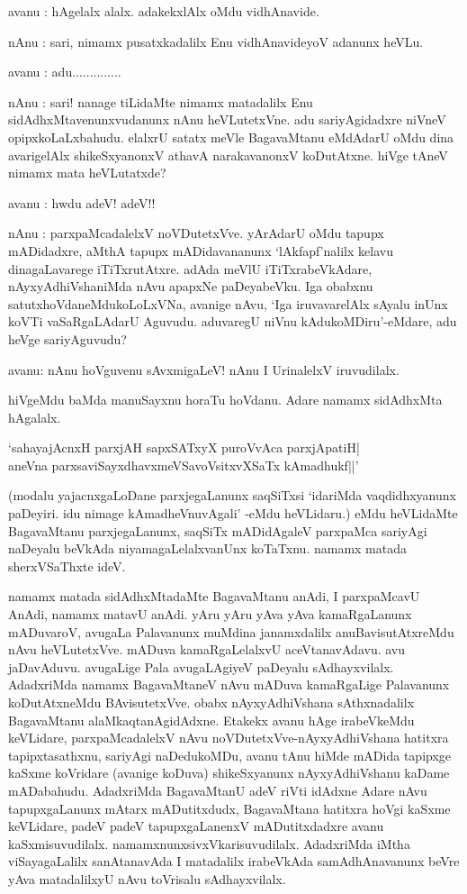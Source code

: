 avanu : hAgelalx alalx. adakekxlAlx oMdu vidhAnavide.

nAnu : sari, nimamx pusatxkadalilx Enu vidhAnavideyoV adanunx heVLu.

avanu : adu..............

nAnu : sari! nanage tiLidaMte nimamx matadalilx Enu sidAdhxMtavenunxvudanunx nAnu heVLutetxVne. adu sariyAgidadxre niVneV opipxkoLaLxbahudu. elalxrU satatx meVle BagavaMtanu eMdAdarU oMdu dina avarigelAlx shikeSxyanonxV athavA narakavanonxV koDutAtxne. hiVge tAneV 
nimamx mata heVLutatxde?

avanu : hwdu adeV! adeV!!

nAnu : parxpaMcadalelxV noVDutetxVve. yArAdarU oMdu tapupx mADidadxre, aMthA tapupx mADidavananunx `lAkfapf'nalilx kelavu dinagaLavarege iTiTxrutAtxre. adAda meVlU iTiTxrabeVkAdare, nAyxyAdhiVshaniMda nAvu apapxNe paDeyabeVku. Iga obabxnu satutxhoVdaneMdukoLoLxVNa, avanige nAvu, `Iga iruvavarelAlx sAyalu inUnx koVTi vaSaRgaLAdarU Aguvudu. aduvaregU niVnu kAdukoMDiru'-eMdare, adu heVge sariyAguvudu?

avanu: nAnu hoVguvenu sAvxmigaLeV! nAnu I UrinalelxV iruvudilalx.

hiVgeMdu baMda manuSayxnu horaTu hoVdanu. Adare namamx sidAdhxMta hAgalalx.

\begin{shloka}
`sahayajAcnxH parxjAH sapxSATxyX puroVvAca parxjApatiH|\\
aneVna parxsaviSayxdhavxmeVSavoV\s sitxvXSaTx kAmadhukf||'
\end{shloka}

(modalu yajacnxgaLoDane parxjegaLanunx saqSiTxsi `idariMda vaqdidhxyanunx paDeyiri. idu nimage kAmadheVnuvAgali' -eMdu heVLidaru.) eMdu heVLidaMte BagavaMtanu parxjegaLanunx, saqSiTx mADidAgaleV parxpaMca sariyAgi naDeyalu beVkAda niyamagaLelalxvanUnx koTaTxnu. 
namamx matada sherxVSaThxte ideV.

namamx matada sidAdhxMtadaMte BagavaMtanu anAdi, I parxpaMcavU AnAdi, namamx matavU anAdi. yAru yAru yAva yAva kamaRgaLanunx mADuvaroV, avugaLa Palavanunx muMdina janamxdalilx anuBavisutAtxreMdu nAvu heVLutetxVve. mADuva kamaRgaLelalxvU aceVtanavAdavu. avu jaDavAduvu. avugaLige Pala avugaLAgiyeV paDeyalu sAdhayxvilalx. AdadxriMda namamx BagavaMtaneV nAvu mADuva kamaRgaLige Palavanunx koDutAtxneMdu BAvisutetxVve. obabx nAyxyAdhiVshana sAthxnadalilx BagavaMtanu alaMkaqtanAgidAdxne. Etakekx avanu hAge irabeVkeMdu 
keVLidare, parxpaMcadalelxV nAvu noVDutetxVve-nAyxyAdhiVshana hatitxra tapipxtasathxnu, sariyAgi naDedukoMDu, avanu tAnu hiMde mADida tapipxge kaSxme koVridare (avanige koDuva) shikeSxyanunx nAyxyAdhiVshanu kaDame mADabahudu. AdadxriMda BagavaMtanU adeV riVti idAdxne Adare nAvu tapupxgaLanunx mAtarx mADutitxdudx, BagavaMtana hatitxra hoVgi kaSxme keVLidare, padeV padeV tapupxgaLanenxV mADutitxdadxre avanu kaSxmisuvudilalx. namamxnunxsivxVkarisuvudilalx. AdadxriMda iMtha viSayagaLalilx sanAtanavAda I matadalilx 
irabeVkAda samAdhAnavanunx beVre yAva matadalilxyU nAvu toVrisalu sAdhayxvilalx.

